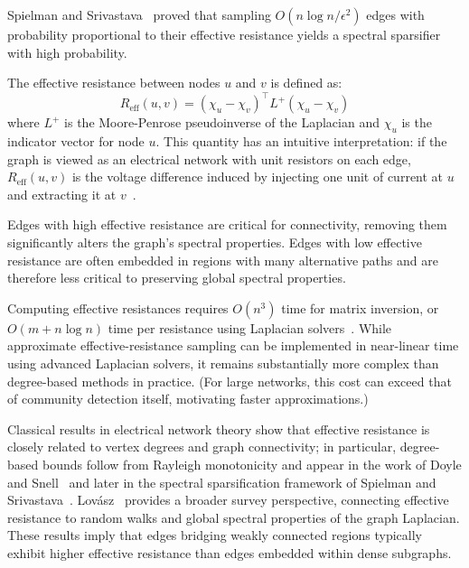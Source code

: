 \documentclass[10pt,journal,compsoc]{IEEEtran}
\begin{document}
Spielman and Srivastava~\cite{spielman2008graph} proved that sampling 
$O(n \log n / \epsilon^2)$ edges with probability proportional to their 
effective resistance yields a spectral sparsifier with high probability.

The effective resistance between nodes $u$ and $v$ is defined as:
\begin{equation}
R_{\text{eff}}(u,v) = (\chi_u - \chi_v)^\top L^+ (\chi_u - \chi_v)
\label{eq:effective-resistance}
\end{equation}
where $L^+$ is the Moore-Penrose pseudoinverse of the Laplacian and 
$\chi_u$ is the indicator vector for node $u$. This quantity has an 
intuitive interpretation: if the graph is viewed as an electrical network 
with unit resistors on each edge, $R_{\text{eff}}(u,v)$ is the voltage 
difference induced by injecting one unit of current at $u$ and extracting 
it at $v$~\cite{doyle1984random}.

Edges with high effective resistance are critical for connectivity, removing them significantly alters the graph's spectral properties. Edges with low effective resistance are often embedded in regions with many alternative paths and are therefore less critical to preserving global spectral properties.

Computing effective resistances requires $O(n^3)$ time for matrix 
inversion, or $O(m + n \log n)$ time per resistance using Laplacian 
solvers~\cite{spielman2014nearly}. While approximate effective-resistance sampling can be implemented in near-linear time using advanced Laplacian solvers, it remains substantially more complex than degree-based methods in practice. (For large networks, 
this cost can exceed that of community detection itself, motivating 
faster approximations.)


Classical results in electrical network theory show that effective resistance 
is closely related to vertex degrees and graph connectivity; in particular, 
degree-based bounds follow from Rayleigh monotonicity and appear in the work of 
Doyle and Snell~\cite{doyle1984random} and later in the spectral sparsification 
framework of Spielman and Srivastava~\cite{spielman2008graph}. 
Lov\'{a}sz~\cite{lovasz1993random} provides a broader survey perspective, 
connecting effective resistance to random walks and global spectral properties 
of the graph Laplacian. These results imply that edges bridging weakly connected 
regions typically exhibit higher effective resistance than edges embedded 
within dense subgraphs.
\end{document}
